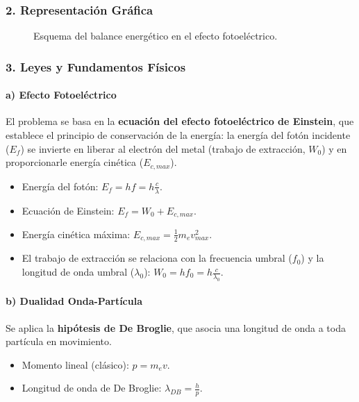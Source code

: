 \subsubsection*{2. Representación Gráfica}
\begin{figure}[H]
    \centering
    \caption{Esquema del balance energético en el efecto fotoeléctrico.}
\end{figure}

\subsubsection*{3. Leyes y Fundamentos Físicos}
\paragraph*{a) Efecto Fotoeléctrico}
El problema se basa en la \textbf{ecuación del efecto fotoeléctrico de Einstein}, que establece el principio de conservación de la energía: la energía del fotón incidente ($E_f$) se invierte en liberar al electrón del metal (trabajo de extracción, $W_0$) y en proporcionarle energía cinética ($E_{c,max}$).
\begin{itemize}
    \item Energía del fotón: $E_f = h f = h \frac{c}{\lambda}$.
    \item Ecuación de Einstein: $E_f = W_0 + E_{c,max}$.
    \item Energía cinética máxima: $E_{c,max} = \frac{1}{2} m_e v_{max}^2$.
    \item El trabajo de extracción se relaciona con la frecuencia umbral ($f_0$) y la longitud de onda umbral ($\lambda_0$): $W_0 = h f_0 = h \frac{c}{\lambda_0}$.
\end{itemize}
\paragraph*{b) Dualidad Onda-Partícula}
Se aplica la \textbf{hipótesis de De Broglie}, que asocia una longitud de onda a toda partícula en movimiento.
\begin{itemize}
    \item Momento lineal (clásico): $p = m_e v$.
    \item Longitud de onda de De Broglie: $\lambda_{DB} = \frac{h}{p}$.
\end{itemize}

